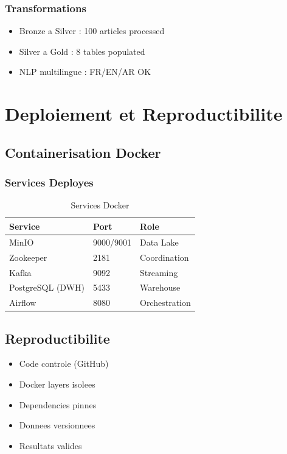 \documentclass[12pt,a4paper]{report}
\newcommand{\checkmark}{\ding{51}}
\begin{document}
\subsection{Transformations}

\begin{itemize}
    \item[\checkmark] Bronze a Silver : 100 articles processed
    \item[\checkmark] Silver a Gold : 8 tables populated
    \item[\checkmark] NLP multilingue : FR/EN/AR OK
\end{itemize}


\chapter{Deploiement et Reproductibilite}

\section{Containerisation Docker}

\subsection{Services Deployes}

\begin{table}[H]
\centering
\begin{tabular}{lll}
\toprule
\textbf{Service} & \textbf{Port} & \textbf{Role} \\
\midrule
MinIO & 9000/9001 & Data Lake \\
Zookeeper & 2181 & Coordination \\
Kafka & 9092 & Streaming \\
PostgreSQL (DWH) & 5433 & Warehouse \\
Airflow & 8080 & Orchestration \\
\bottomrule
\end{tabular}
\caption{Services Docker}
\end{table}

\section{Reproductibilite}

\begin{itemize}
    \item[\checkmark] Code controle (GitHub)
    \item[\checkmark] Docker layers isolees
    \item[\checkmark] Dependencies pinnes
    \item[\checkmark] Donnees versionnees
    \item[\checkmark] Resultats valides
\end{itemize}
\end{document}
